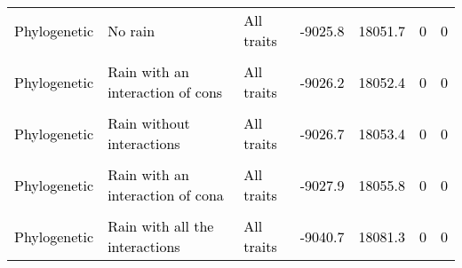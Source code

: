 \documentclass[
  12pt,
  letterpaper,
  DIV=11,
  numbers=noendperiod]{scrartcl}
\begin{document}
\begin{table}[H]
{\begin{tabular}[t]{lllllll}
\addlinespace
\textcolor{black}{Phylogenetic} & \textcolor{black}{No rain} & \textcolor{black}{All traits} & \textcolor{black}{-9025.8} & \textcolor{black}{18051.7} & \textcolor{black}{0} & \textcolor{black}{0}\\
\cellcolor{gray!6}{\textcolor{black}{Non-phylogenetic}} & \cellcolor{gray!6}{\textcolor{black}{Rain without interactions}} & \cellcolor{gray!6}{\textcolor{black}{All traits}} & \cellcolor{gray!6}{\textcolor{black}{-9025.8}} & \cellcolor{gray!6}{\textcolor{black}{18051.7}} & \cellcolor{gray!6}{\textcolor{black}{0}} & \cellcolor{gray!6}{\textcolor{black}{0}}\\
\textcolor{black}{Phylogenetic} & \textcolor{black}{Rain with an interaction of cons} & \textcolor{black}{All traits} & \textcolor{black}{-9026.2} & \textcolor{black}{18052.4} & \textcolor{black}{0} & \textcolor{black}{0}\\
\cellcolor{gray!6}{\textcolor{black}{Non-phylogenetic}} & \cellcolor{gray!6}{\textcolor{black}{Rain with an interaction of cona}} & \cellcolor{gray!6}{\textcolor{black}{All traits}} & \cellcolor{gray!6}{\textcolor{black}{-9026.3}} & \cellcolor{gray!6}{\textcolor{black}{18052.7}} & \cellcolor{gray!6}{\textcolor{black}{0}} & \cellcolor{gray!6}{\textcolor{black}{0}}\\
\textcolor{black}{Phylogenetic} & \textcolor{black}{Rain without interactions} & \textcolor{black}{All traits} & \textcolor{black}{-9026.7} & \textcolor{black}{18053.4} & \textcolor{black}{0} & \textcolor{black}{0}\\
\addlinespace
\cellcolor{gray!6}{\textcolor{black}{Phylogenetic}} & \cellcolor{gray!6}{\textcolor{black}{Rain with an interaction of cons and cona}} & \cellcolor{gray!6}{\textcolor{black}{All traits}} & \cellcolor{gray!6}{\textcolor{black}{-9026.8}} & \cellcolor{gray!6}{\textcolor{black}{18053.6}} & \cellcolor{gray!6}{\textcolor{black}{0}} & \cellcolor{gray!6}{\textcolor{black}{0}}\\
\textcolor{black}{Phylogenetic} & \textcolor{black}{Rain with an interaction of cona} & \textcolor{black}{All traits} & \textcolor{black}{-9027.9} & \textcolor{black}{18055.8} & \textcolor{black}{0} & \textcolor{black}{0}\\
\cellcolor{gray!6}{\textcolor{black}{Non-phylogenetic}} & \cellcolor{gray!6}{\textcolor{black}{Rain with all the interactions}} & \cellcolor{gray!6}{\textcolor{black}{All traits}} & \cellcolor{gray!6}{\textcolor{black}{-9040.6}} & \cellcolor{gray!6}{\textcolor{black}{18081.1}} & \cellcolor{gray!6}{\textcolor{black}{0}} & \cellcolor{gray!6}{\textcolor{black}{0}}\\
\textcolor{black}{Phylogenetic} & \textcolor{black}{Rain with all the interactions} & \textcolor{black}{All traits} & \textcolor{black}{-9040.7} & \textcolor{black}{18081.3} & \textcolor{black}{0} & \textcolor{black}{0}\\
\bottomrule
\end{tabular}}
\end{table}
\end{document}
